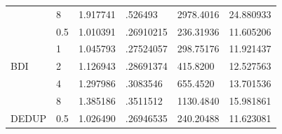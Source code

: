 \begin{table}[]
{\begin{tabular}{llllll}
    \multicolumn{1}{l|}{}                          & \multicolumn{1}{l|}{8}   & 1.917741                                                                          & .526493                                                                                & 2978.4016                                                                        & 24.880933                      \\ \cline{1-2}
    \multicolumn{1}{l|}{\multirow{5}{*}{BDI}}      & \multicolumn{1}{l|}{0.5} & 1.010391                                                                          & .26910215                                                                              & 236.31936                                                                        & 11.605206                      \\
    \multicolumn{1}{l|}{}                          & \multicolumn{1}{l|}{1}   & 1.045793                                                                          & .27524057                                                                              & 298.75176                                                                        & 11.921437                      \\
    \multicolumn{1}{l|}{}                          & \multicolumn{1}{l|}{2}   & 1.126943                                                                          & .28691374                                                                              & 415.8200                                                                         & 12.527563                      \\
    \multicolumn{1}{l|}{}                          & \multicolumn{1}{l|}{4}   & 1.297986                                                                          & .3083546                                                                               & 655.4520                                                                         & 13.701536                      \\
    \multicolumn{1}{l|}{}                          & \multicolumn{1}{l|}{8}   & 1.385186                                                                          & .3511512                                                                               & 1130.4840                                                                        & 15.981861                      \\ \cline{1-2}
    \multicolumn{1}{l|}{\multirow{5}{*}{DEDUP}}    & \multicolumn{1}{l|}{0.5} & 1.026490                                                                          & .26946535                                                                              & 240.20488                                                                        & 11.623081                      \\

\end{tabular}}
\end{table}
